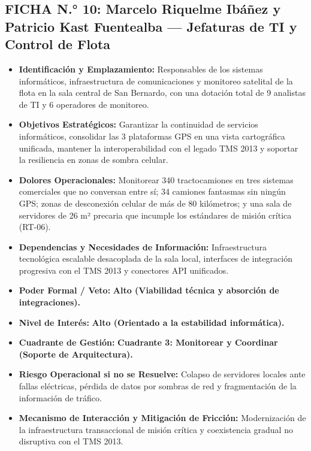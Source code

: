 \subsection*{FICHA N.° 10: Marcelo Riquelme Ibáñez y Patricio Kast Fuentealba — Jefaturas de TI y Control de Flota}
\begin{itemize}
\item \textbf{Identificación y Emplazamiento:} Responsables de los sistemas informáticos, infraestructura de comunicaciones y monitoreo satelital de la flota en la sala central de San Bernardo, con una dotación total de 9 analistas de TI y 6 operadores de monitoreo.
\item \textbf{Objetivos Estratégicos:} Garantizar la continuidad de servicios informáticos, consolidar las 3 plataformas GPS en una vista cartográfica unificada, mantener la interoperabilidad con el legado TMS 2013 y soportar la resiliencia en zonas de sombra celular.
\item \textbf{Dolores Operacionales:} Monitorear 340 tractocamiones en tres sistemas comerciales que no conversan entre sí; 34 camiones fantasmas sin ningún GPS; zonas de desconexión celular de más de 80 kilómetros; y una sala de servidores de 26 m² precaria que incumple los estándares de misión crítica (RT-06).
\item \textbf{Dependencias y Necesidades de Información:} Infraestructura tecnológica escalable desacoplada de la sala local, interfaces de integración progresiva con el TMS 2013 y conectores API unificados.
\item \textbf{Poder Formal / Veto:} \textbf{Alto (Viabilidad técnica y absorción de integraciones).}
\item \textbf{Nivel de Interés:} \textbf{Alto (Orientado a la estabilidad informática).}
\item \textbf{Cuadrante de Gestión:} \textbf{Cuadrante 3: Monitorear y Coordinar (Soporte de Arquitectura).}
\item \textbf{Riesgo Operacional si no se Resuelve:} Colapso de servidores locales ante fallas eléctricas, pérdida de datos por sombras de red y fragmentación de la información de tráfico.
\item \textbf{Mecanismo de Interacción y Mitigación de Fricción:} Modernización de la infraestructura transaccional de misión crítica y coexistencia gradual no disruptiva con el TMS 2013.
\end{itemize}
